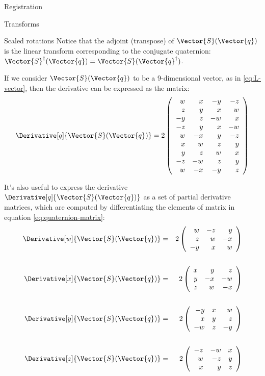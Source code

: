 \begin{plSection}{Registration}
\begin{plSection}{Transforms}
\begin{plSection}{Scaled rotations}
Notice that the adjoint (transpose) of $\Vector{S}(\Vector{q})$
is the linear transform corresponding to the conjugate quaternion:
$\Vector{S}^{\dagger}(\Vector{q}) =  \Vector{S}(\Vector{q}^{\dagger})$.

If we consider $\Vector{S}(\Vector{q})$ to be a 9-dimensional vector,
as in \cref{eq:L-vector},
then the derivative can be expressed as the matrix:
\begin{equation}
\label{eq:quaternion-derivative-matrix}
\Derivative[q]{\Vector{S}(\Vector{q})}
 = 2 \left(
\begin{array}{rrrr}
  w &  x & -y & -z \\
  z &  y &  x &  w \\
 -y &  z & -w &  x \\
 -z &  y &  x & -w \\
  w & -x &  y & -z \\
  x &  w &  z &  y \\
  y &  z &  w &  x \\
 -z & -w &  z &  y \\
  w & -x & -y &  z \\
\end{array}
\right)
\end{equation}

It's also useful to express the derivative $\Derivative[q]{\Vector{S}(\Vector{q})}$
as a set of partial derivative matrices,
which are computed
by differentiating the elements of matrix in equation
\ref{eq:quaternion-matrix}:
\begin{eqnarray}
\label{eq:quaternion-matrix-partial-derivatives}
\Derivative[w]{\Vector{S}(\Vector{q})}
& = &
2 \left(
\begin{array}{rrr}
 w & -z &  y \\
 z &  w & -x \\
-y &  x &  w
\end{array}
\right)
\\
\nonumber
\\
\Derivative[x]{\Vector{S}(\Vector{q})}
& = &
2 \left(
\begin{array}{rrr}
 x &  y &  z \\
 y & -x & -w \\
 z &  w & -x
\end{array}
\right)
\nonumber
\\
\nonumber
\\
\Derivative[y]{\Vector{S}(\Vector{q})}
& = &
2 \left(
\begin{array}{rrr}
-y &  x &  w \\
 x &  y &  z \\
-w &  z & -y
\end{array}
\right)
\nonumber
\\
\nonumber
\\
\Derivative[z]{\Vector{S}(\Vector{q})}
& = &
2 \left(
\begin{array}{rrr}
-z & -w &  x \\
 w & -z &  y \\
 x &  y &  z
\end{array}
\right)
\nonumber
\end{eqnarray}


\end{plSection}
\end{plSection}
\end{plSection}
